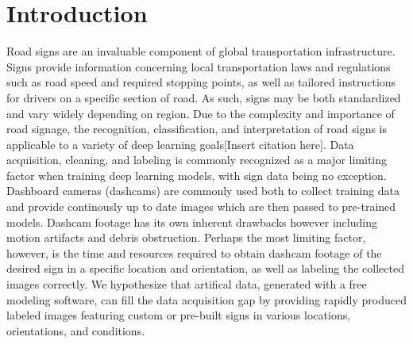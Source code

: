 \documentclass[journal]{IEEEtran}
\begin{document}
%
\IEEEpeerreviewmaketitle



\section{Introduction}
% 
% 
% 
% 

 
Road signs are an invaluable component of global transportation infrastructure. Signs provide information concerning local transportation laws and regulations such as road speed and required stopping points, as well as tailored instructions for drivers on a specific section of road. As such, signs may be both standardized and vary widely depending on region. Due to the complexity and importance of road signage, the recognition, classification, and interpretation of road signs is applicable to a variety of deep learning goals[Insert citation here]. Data acquisition, cleaning, and labeling is commonly recognized as a major limiting factor when training deep learning models\cite{Whang_datacollection}, with sign data being no exception. Dashboard cameras (dashcams) are commonly used both to collect training data and provide continously up to date images which are then passed to pre-trained models. Dashcam footage has its own inherent drawbacks however including motion artifacts and debris obstruction. Perhaps the most limiting factor, however, is the time and resources required to obtain dashcam footage of the desired sign in a specific location and orientation, as well as labeling the collected images correctly. We hypothesize that artifical data, generated with a free modeling software, can fill the data acquisition gap by providing rapidly produced labeled images featuring custom or pre-built signs in various locations, orientations, and conditions. 
\end{document}
